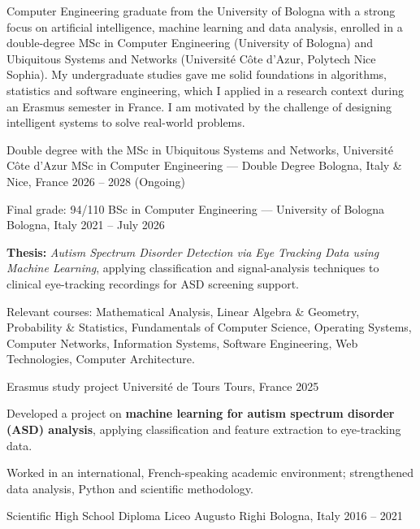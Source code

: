 \documentclass[11pt, a4paper]{../awesome-cv}
\begin{document}
\makecvheader[C]


\begin{cvparagraph}
Computer Engineering graduate from the University of Bologna with a strong focus on artificial intelligence,
machine learning and data analysis, enrolled in a double-degree MSc in Computer Engineering (University of
Bologna) and Ubiquitous Systems and Networks (Université Côte d'Azur, Polytech Nice Sophia). My undergraduate
studies gave me solid foundations in algorithms, statistics and software engineering, which I applied in a
research context during an Erasmus semester in France. I am motivated by the challenge of designing
intelligent systems to solve real-world problems.
\end{cvparagraph}

\begin{cventries}
  \cventry
    {Double degree with the MSc in Ubiquitous Systems and Networks, Université Côte d'Azur}
    {MSc in Computer Engineering — Double Degree}
    {Bologna, Italy \& Nice, France}
    {2026 -- 2028 (Ongoing)}
    {}

  \cventry
    {Final grade: 94/110}
    {BSc in Computer Engineering — University of Bologna}
    {Bologna, Italy}
    {2021 -- July 2026}
    {
      \begin{cvitems}
        \item {\textbf{Thesis:} \textit{Autism Spectrum Disorder Detection via Eye Tracking Data using Machine Learning}, applying classification and signal-analysis techniques to clinical eye-tracking recordings for ASD screening support.}
        \item {Relevant courses: Mathematical Analysis, Linear Algebra \& Geometry, Probability \& Statistics, Fundamentals of Computer Science, Operating Systems, Computer Networks, Information Systems, Software Engineering, Web Technologies, Computer Architecture.}
      \end{cvitems}
    }

  \cventry
    {Erasmus study project}
    {Université de Tours}
    {Tours, France}
    {2025}
    {
      \begin{cvitems}
        \item {Developed a project on \textbf{machine learning for autism spectrum disorder (ASD) analysis}, applying classification and feature extraction to eye-tracking data.}
        \item {Worked in an international, French-speaking academic environment; strengthened data analysis, Python and scientific methodology.}
      \end{cvitems}
    }

  \cventry
    {Scientific High School Diploma}
    {Liceo Augusto Righi}
    {Bologna, Italy}
    {2016 -- 2021}
    {}
\end{cventries}
\end{document}
